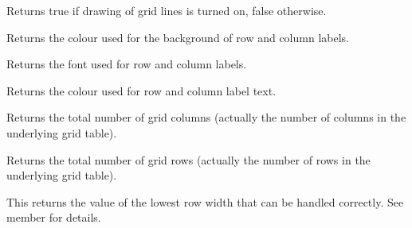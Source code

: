 
Returns true if drawing of grid lines is turned on, false otherwise.



\label{wxgridgetlabelbackgroundcolour}


Returns the colour used for the background of row and column labels.



\label{wxgridgetlabelfont}


Returns the font used for row and column labels.



\label{wxgridgetlabeltextcolour}


Returns the colour used for row and column label text.



\label{wxgridgetnumbercols}


Returns the total number of grid columns (actually the number of columns in the underlying grid
table).



\label{wxgridgetnumberrows}


Returns the total number of grid rows (actually the number of rows in the underlying grid table).



\label{wxgridgetorcreatecellattr}




\label{wxgridgetrowminimalacceptableheight}


This returns the value of the lowest row width that can be handled correctly. See
member  for details.



